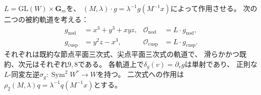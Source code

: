 \begin{lemma}[節点・尖点軌道上の方向微分の同変分裂]
\label{lem:pg-equivariant-singular-retractions}
$L=\mathrm{GL}(W)\times\mathbf G_m$を、
$(M,\lambda)\cdot g=\lambda^{-1}g(M^{-1}x)$によって作用させる。
次の二つの被約軌道を考える：
\begin{equation}
 \begin{aligned}
 g_{\mathrm{nod}}&=x^3+y^3+xyz,&
 \mathcal O_{\mathrm{nod}}&=L\cdot g_{\mathrm{nod}},\\
 g_{\mathrm{cusp}}&=y^2z-x^3,&
 \mathcal O_{\mathrm{cusp}}&=L\cdot g_{\mathrm{cusp}}.
 \end{aligned}
 \label{eq:pg-equivariant-singular-orbits}
\end{equation}
それぞれは既約な節点平面三次式、尖点平面三次式の軌道で、
滑らかかつ既約、次元はそれぞれ$9,8$である。
各軌道上で$\delta_g(v)=\partial_vg$は単射であり、
正則な$L$-同変左逆$\sigma_g:\operatorname{Sym}^2W^*\to W$を持つ。
二次式への作用は$\rho_2(M,\lambda)q=\lambda^{-1}q(M^{-1}x)$とする。
\end{lemma}
